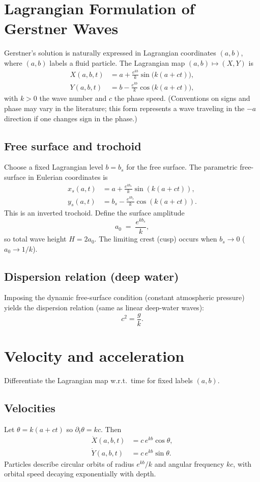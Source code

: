 \documentclass[11pt]{article}
\begin{document}
\section{Lagrangian Formulation of Gerstner Waves}
Gerstner’s solution is naturally expressed in Lagrangian coordinates $(a,b)$, where $(a,b)$ labels a fluid particle. The Lagrangian map $(a,b)\mapsto (X,Y)$ is
\begin{align}
X(a,b,t) &= a + \frac{e^{k b}}{k}\sin\big(k(a+ct)\big), \label{eq:gerstnerX}\\
Y(a,b,t) &= b - \frac{e^{k b}}{k}\cos\big(k(a+ct)\big), \label{eq:gerstnerY}
\end{align}
with $k>0$ the wave number and $c$ the phase speed. (Conventions on signs and phase may vary in the literature; this form represents a wave traveling in the $-a$ direction if one changes sign in the phase.)

\subsection{Free surface and trochoid}
Choose a fixed Lagrangian level $b=b_s$ for the free surface. The parametric free-surface in Eulerian coordinates is
\begin{align}
x_s(a,t) &= a + \frac{e^{kb_s}}{k}\sin(k(a+ct)), \\
y_s(a,t) &= b_s - \frac{e^{kb_s}}{k}\cos(k(a+ct)).
\end{align}
This is an inverted trochoid. Define the surface amplitude
\[
a_0 \;=\; \frac{e^{kb_s}}{k},
\]
so total wave height $H=2a_0$. The limiting crest (cusp) occurs when $b_s\to 0$ ($a_0\to 1/k$).

\subsection{Dispersion relation (deep water)}
Imposing the dynamic free-surface condition (constant atmospheric pressure) yields the dispersion relation (same as linear deep-water waves):
\begin{equation}
c^2 = \frac{g}{k}. \label{eq:dispersion}
\end{equation}

\section{Velocity and acceleration}
Differentiate the Lagrangian map w.r.t.\ time for fixed labels $(a,b)$.

\subsection{Velocities}
Let $\theta=k(a+ct)$ so $\partial_t\theta = kc$. Then
\begin{align}
\dot X(a,b,t) &= c\,e^{k b}\cos\theta, \label{eq:velX}\\
\dot Y(a,b,t) &= c\,e^{k b}\sin\theta. \label{eq:velY}
\end{align}
Particles describe circular orbits of radius $e^{kb}/k$ and angular frequency $kc$, with orbital speed decaying exponentially with depth.
\end{document}
